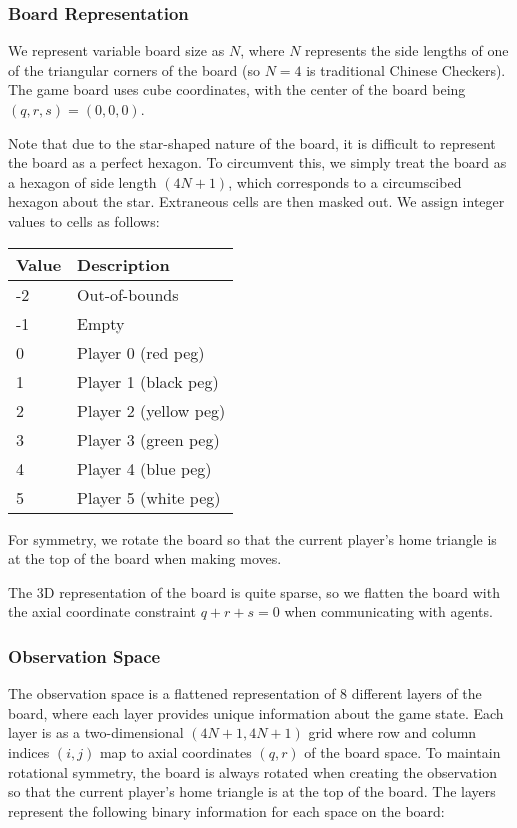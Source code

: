 \documentclass[12pt, a4paper, twocolumn]{article}
\begin{document}
\subsubsection{Board Representation}
We represent variable board size as $N$, where $N$ represents the side lengths of one of the triangular corners of the board (so $N=4$ is traditional Chinese Checkers). The game board uses cube coordinates, with the center of the board being $(q, r, s) = (0, 0, 0)$.

Note that due to the star-shaped nature of the board, it is difficult to represent the board as a perfect hexagon. To circumvent this, we simply treat the board as a hexagon of side length $(4N+1)$, which corresponds to a circumscibed hexagon about the star. Extraneous cells are then masked out. We assign integer values to cells as follows:

\begin{center}
  \begin{tabular}{|m{}|m{}|}
    \hline
    Value & Description \\
    \hline
    -2 & Out-of-bounds \\
    -1 & Empty \\
    0 & Player 0 (red peg) \\
    1 & Player 1 (black peg) \\
    2 & Player 2 (yellow peg) \\
    3 & Player 3 (green peg) \\
    4 & Player 4 (blue peg) \\
    5 & Player 5 (white peg) \\
    \hline
  \end{tabular}
  \end{center}

For symmetry, we rotate the board so that the current player's home triangle is at the top of the board when making moves. 
  
The 3D representation of the board is quite sparse, so we flatten the board with the axial coordinate constraint $q + r + s = 0$ when communicating with agents.

\subsubsection{Observation Space}

The observation space is a flattened representation of 8 different layers of the board, where each layer provides unique information about the game state. Each layer is as a two-dimensional $(4N + 1, 4N + 1)$ grid where row and column indices $(i, j)$ map to axial coordinates $(q, r)$ of the board space. To maintain rotational symmetry, the board is always rotated when creating the observation so that the current player's home triangle is at the top of the board. The layers represent the following binary information for each space on the board:
\end{document}

